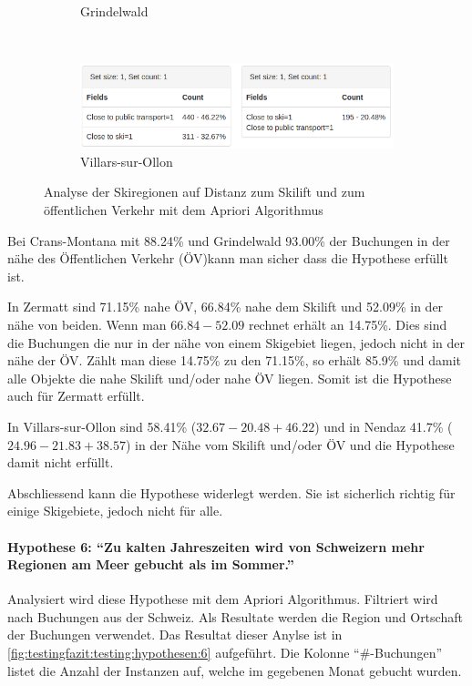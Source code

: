 \begin{figure}[htb]
\begin{subfigure}[t]{0.8\textwidth}
		\caption{Grindelwald}
		\label{sec:testingfazit:testing:hypothesen:5:4}
	\end{subfigure} \\
	\begin{subfigure}[t]{0.8\textwidth}
		\centering
		\includegraphics[width=1\textwidth]{images/hypothese5-villars}
		\caption{Villars-sur-Ollon}
		\label{sec:testingfazit:testing:hypothesen:5:5}
	\end{subfigure}
	\caption{Analyse der Skiregionen auf Distanz zum Skilift und zum öffentlichen Verkehr mit dem Apriori Algorithmus}
	\label{sec:testingfazit:testing:hypothesen:5}
\end{figure}

Bei Crans-Montana mit 88.24\% und Grindelwald 93.00\% der Buchungen in der nähe des Öffentlichen Verkehr (ÖV)kann man sicher dass die Hypothese erfüllt ist. 

In Zermatt sind 71.15\% nahe ÖV, 66.84\% nahe dem Skilift und 52.09\% in der nähe von beiden. Wenn man $66.84 - 52.09$ rechnet erhält an 14.75\%. Dies sind die Buchungen die nur in der nähe von einem Skigebiet liegen, jedoch nicht in der nähe der ÖV. Zählt man diese 14.75\% zu den 71.15\%, so erhält 85.9\% und damit alle Objekte die nahe Skilift und/oder nahe ÖV liegen. Somit ist die Hypothese auch für Zermatt erfüllt.

In Villars-sur-Ollon sind 58.41\% ($32.67-20.48+46.22$)  und in Nendaz 41.7\% ($24.96-21.83+38.57$) in der Nähe vom Skilift und/oder ÖV und die Hypothese damit nicht erfüllt.

Abschliessend kann die Hypothese widerlegt werden. Sie ist sicherlich richtig für einige Skigebiete, jedoch nicht für alle.

\paragraph{Hypothese 6: "`Zu kalten Jahreszeiten wird von Schweizern mehr Regionen am Meer gebucht als im Sommer."'} Analysiert wird diese Hypothese mit dem Apriori Algorithmus. Filtriert wird nach Buchungen aus der Schweiz. Als Resultate werden die Region und Ortschaft der Buchungen verwendet. Das Resultat dieser Anylse ist in \cref{fig:testingfazit:testing:hypothesen:6} aufgeführt. Die Kolonne "`\#-Buchungen"' listet die Anzahl der Instanzen auf, welche im gegebenen Monat gebucht wurden.

